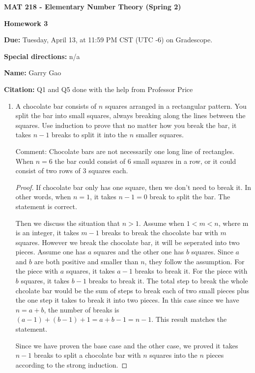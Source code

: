 \documentclass[11pt,a4paper]{article}
\begin{document}
\begin{Large}
\centerline{\bf MAT 218 - Elementary Number Theory (Spring 2)}\medskip
\centerline{\bf Homework 3}\medskip
\end{Large}
{\bf Due:} Tuesday, April 13, at 11:59 PM CST (UTC -6) on Gradescope.

{\bf Special directions:} n/a

{\bf Name:} Garry Gao

{\bf Citation:} Q1 and Q5 done with the help from Professor Price


\hrulefill

\begin{enumerate}

	\item A chocolate bar consists of \(n\) squares arranged in a rectangular pattern. You split the bar into small squares, always breaking along the lines between the squares. Use induction to prove that no matter how you break the bar, it takes \(n-1\) breaks to split it into the \(n\) smaller squares.

	Comment: Chocolate bars are not necessarily one long line of rectangles. When \(n= 6\) the bar could consist of 6 small squares in a row, or it could consist of two rows of 3 squares each.

	\begin{proof} If chocolate bar only has one square, then we don't need to break it. In other words, when $n=1$, it takes $n-1=0$ break to split the bar. The statement is correct.

	Then we discuss the situation that $n>1$. Assume when $1 < m < n$, where m is an integer, it takes $m-1$ breaks to break the chocolate bar with $m$ squares. However we break the chocolate bar, it will be seperated into two pieces. Assume one has $a$ squares and the other one has $b$ squares. Since $a$ and $b$ are both positive and smaller than $n$, they follow the assumption. For the piece with $a$ squares, it takes $a-1$ breaks to break it. For the piece with $b$ squares, it takes $b-1$ breaks to break it. The total step to break the whole chcolate bar would be the sum of steps to break each of two small pieces plus the one step it takes to break it into two pieces. In this case since we have $n=a+b$, the number of breaks is $(a-1)+(b-1)+1 = a+b-1 = n-1$. This result matches the statement.

	Since we have proven the base case and the other case, we proved it takes $n-1$ breaks to split a chocolate bar with $n$ squares into the $n$ pieces according to the strong induction.
	\end{proof}


\end{enumerate}
\end{document}
